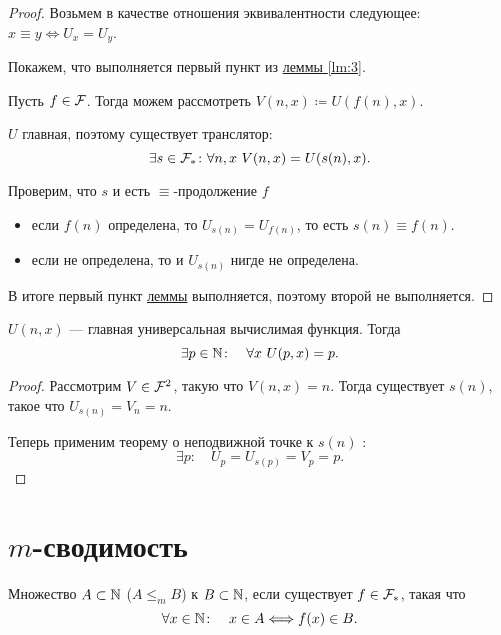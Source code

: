 \begin{proof}
    Возьмем в качестве отношения эквивалентности следующее: $ x \equiv y \Longleftrightarrow U_x = U_y $.

	Покажем, что выполняется первый пункт из \hyperref[lm:3]{леммы \ref{lm:3}}.

	Пусть $ f \in \mathcal{F}$. Тогда можем рассмотреть $ V(n, x) \coloneqq U(f(n), x)$. 

	$ U$ главная, поэтому существует транслятор:
	\[
		\exists s \in \mathcal{F}_{*} \colon  \forall n, x ~V(n, x) = U(s(n), x)
	.\] 

	Проверим, что $ s $ и есть $ \equiv $-продолжение $ f$
	\begin{itemize}
		\item если $ f(n)$ определена, то $ U_{s(n)} = U_{f(n)}$, то есть $ s(n) \equiv f(n)$.
		\item если не определена, то и $ U_{s(n)}$ нигде не определена.
	\end{itemize}

	В итоге первый пункт \hyperref[lm:3]{леммы} выполняется, поэтому второй не выполняется.
\end{proof}
\begin{cor}
	$ U(n, x)$ --- главная универсальная вычислимая функция. Тогда 
	\[
		\exists p \in \mathbb{N} \colon \quad \forall x  ~ U(p, x) = p
	.\] 
\end{cor}
\begin{proof}
	Рассмотрим $ V \in \mathcal{F}^{2}$, такую что $ V(n, x) = n$.
	Тогда существует $ s(n)$, такое что  $ U_{s(n)} = V_n = n$.

	Теперь применим теорему о неподвижной точке к  $ s(n)$ : 
	\[
		\exists p \colon \quad U_p = U_{s(p)} = V_p = p
	.\] 
\end{proof}
\section{$ m$-сводимость}
\begin{defn}[$ m$-сводимость]
	Множество $ A \subset \mathbb{N}$   ($ A \le_{m} B$) к $ B \subset \mathbb{N}$, если существует $ f \in \mathcal{F}_{*}$, такая что
	\[
		\forall x \in \mathbb{N} \colon\quad x \in A \Longleftrightarrow f(x) \in B
	.\] 
\end{defn}

